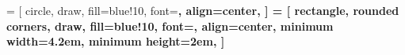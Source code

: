 %
%

\usetikzlibrary{arrows,calc,positioning,shapes,trees}

\newcommand{\tikzNodeText}[1]{\begin{tabular}{l}#1\end{tabular}}
 = [
  circle,
  draw,
  fill=blue!10,
  font=\sffamily\bfseries,
  align=center,
]
 = [
  rectangle,
  rounded corners,
  draw,
  fill=blue!10,
  font=\sffamily\bfseries\footnotesize,
  align=center,
  minimum width=4.2em,
  minimum height=2em,
]
